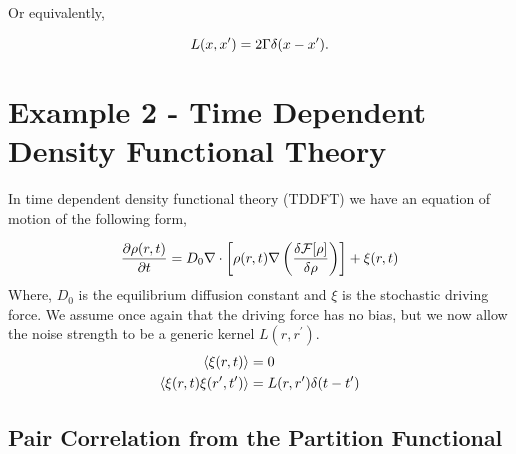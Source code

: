 Or equivalently,

\begin{equation} L(x, x^\prime) = 2\Gamma \delta(x - x^\prime).  \end{equation}

\section{Example 2 - Time Dependent Density Functional Theory} %

In time dependent density functional theory (TDDFT) we have an equation of
motion of the following form,

\begin{equation} \frac{\partial \rho(r, t)}{\partial t} = D_0 \nabla \cdot
\left[\rho(r,t)\nabla \left(\frac{\delta \mathcal{F}[\rho]}{\delta \rho}\right)\right] + \xi(r, t) \end{equation}
%
Where, $D_0$ is the equilibrium diffusion constant and $\xi$ is the stochastic
driving force. We assume once again that the driving force has no bias, but we
now allow the noise strength to be a generic kernel $L(r, r^\prime)$.
%
\begin{align} \langle \xi(r,t) \rangle &= 0 \\ \left\langle \xi(r, t)
\xi(r^\prime, t^\prime) \right\rangle &= L(r, r^\prime) \delta (t -t^\prime)
\end{align}
%
\subsection{Pair Correlation from the Partition Functional} %

